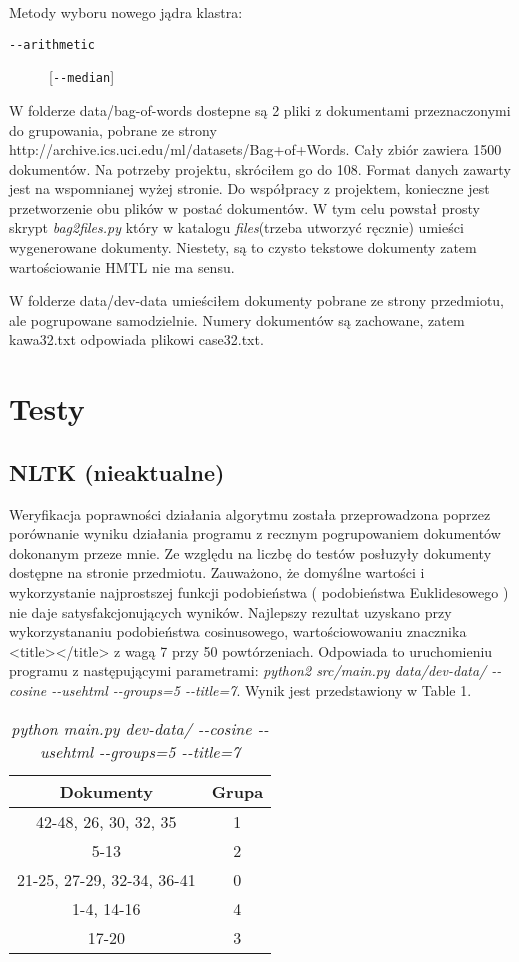 \documentclass{article}
\begin{document}
Metody wyboru nowego jądra klastra:
\begin{description}
\item [\texttt{-{}-arithmetic}] [\texttt{-{}-median}] 
\end{description}
W folderze data/bag-of-words dostepne są 2 pliki z dokumentami przeznaczonymi do grupowania, pobrane ze strony http://archive.ics.uci.edu/ml/datasets/Bag+of+Words. Cały zbiór zawiera 1500 dokumentów. Na potrzeby projektu, skróciłem go do 108. Format danych zawarty jest na wspomnianej wyżej stronie. Do współpracy z projektem, konieczne jest przetworzenie obu plików w postać dokumentów. W tym celu powstał prosty skrypt \emph{bag2files.py} który w katalogu \emph{files}(trzeba utworzyć ręcznie) umieści wygenerowane dokumenty. Niestety, są to czysto tekstowe dokumenty zatem wartościowanie HMTL nie ma sensu.

W folderze data/dev-data umieściłem dokumenty pobrane ze strony przedmiotu, ale pogrupowane samodzielnie. Numery dokumentów są zachowane, zatem kawa32.txt odpowiada plikowi case32.txt.

\section{Testy}
\subsection{NLTK (nieaktualne)}
Weryfikacja poprawności działania algorytmu została przeprowadzona poprzez porównanie wyniku działania programu z recznym pogrupowaniem dokumentów dokonanym przeze mnie. Ze względu na liczbę do testów posłuzyły dokumenty dostępne na stronie przedmiotu. Zauważono, że domyślne wartości i wykorzystanie najprostszej funkcji podobieństwa ( podobieństwa Euklidesowego ) nie daje satysfakcjonujących wyników. Najlepszy rezultat uzyskano przy wykorzystananiu podobieństwa cosinusowego, wartościowowaniu znacznika <title></title> z wagą 7 przy 50 powtórzeniach. Odpowiada to uruchomieniu programu z następującymi parametrami: \emph{python2 src/main.py data/dev-data/ -{}-cosine -{}-usehtml -{}-groups=5  -{}-title=7}. Wynik jest przedstawiony w Table 1. 

\begin{table}[H]
\begin{center}
\begin{tabular}{ | c | c | }
\hline
Dokumenty & Grupa \\ \hline
42-48, 26, 30, 32, 35 & 1 \\ \hline
5-13 & 2 \\ \hline
21-25, 27-29, 32-34, 36-41 & 0 \\ \hline
1-4, 14-16 & 4 \\ \hline
17-20 & 3 \\ \hline
\end{tabular}
\end{center}
\caption{\emph{python main.py dev-data/ -{}-cosine -{}-usehtml -{}-groups=5  -{}-title=7}}
\end{table}
\end{document}

